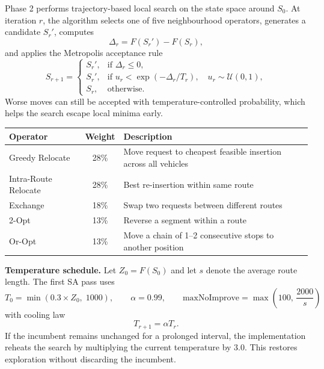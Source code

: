 \documentclass[11pt,a4paper]{article}
\begin{document}
Phase 2 performs trajectory-based local search on the state space around $S_0$. At iteration $r$, the algorithm selects one of five neighbourhood operators, generates a candidate $S_r'$, computes
\[
\Delta_r = F(S_r') - F(S_r),
\]
and applies the Metropolis acceptance rule
\begin{equation}
S_{r+1} =
\begin{cases}
S_r', & \text{if }\Delta_r \le 0,\\
S_r', & \text{if }u_r < \exp(-\Delta_r/T_r),\quad u_r\sim \mathcal U(0,1),\\
S_r, & \text{otherwise.}
\end{cases}
\label{eq:sa-accept}
\end{equation}
Worse moves can still be accepted with temperature-controlled probability, which helps the search escape local minima early.

\vspace{4pt}
\begin{center}
\small
\begin{tabular}{@{}p{}cp{}@{}}
\toprule
\rowcolor{rowhead}\color{white}\textbf{Operator} & \color{white}\textbf{Weight} & \color{white}\textbf{Description}\\
\midrule
\rowcolor{rowalt}Greedy Relocate   & 28\% & Move request to cheapest feasible insertion across all vehicles\\
Intra-Route Relocate              & 28\% & Best re-insertion within same route\\
\rowcolor{rowalt}Exchange          & 18\% & Swap two requests between different routes\\
2-Opt                             & 13\% & Reverse a segment within a route\\
\rowcolor{rowalt}Or-Opt            & 13\% & Move a chain of 1--2 consecutive stops to another position\\
\bottomrule
\end{tabular}
\end{center}

\vspace{6pt}
\noindent\textbf{Temperature schedule.} Let $Z_0=F(S_0)$ and let $s$ denote the average route length. The first SA pass uses
\[
T_0 = \min(0.3 \times Z_0,\; 1000), \qquad
\alpha = 0.99, \qquad
\text{maxNoImprove} = \max\!\left(100,\, \frac{2000}{s}\right)
\]
with cooling law
\[
T_{r+1}=\alpha T_r .
\]
If the incumbent remains unchanged for a prolonged interval, the implementation reheats the search by multiplying the current temperature by $3.0$. This restores exploration without discarding the incumbent.
\end{document}
